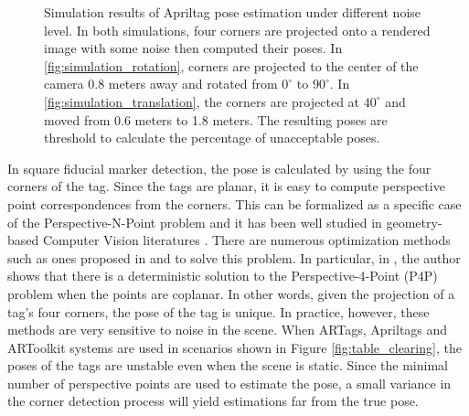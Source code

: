 \begin{figure}[h]
\caption{Simulation results of Apriltag pose estimation under different noise level. In both simulations, four corners are projected onto a rendered image with some noise then computed their poses. In \ref{fig:simulation_rotation}, corners are projected to the center of the camera 0.8 meters away and rotated from $0^{\circ}$ to $90^{\circ}$. In \ref{fig:simulation_translation}, the corners are projected at $40^{\circ}$ and moved from 0.6 meters to 1.8 meters. The resulting poses are threshold to calculate the percentage of unacceptable poses.}
\label{fig:simulation_results}
\end{figure}

In square fiducial marker detection, the pose is calculated by using the four corners of the tag. Since the tags are planar, it is easy to compute perspective point correspondences from the corners. This can be formalized as a specific case of the Perspective-N-Point problem and it has been well studied in geometry-based Computer Vision literatures \citep{hartley2003multiple, zhang2005general}. There are numerous optimization methods such as ones proposed in \citep{dementhon1992exact} and \citep{haralick1994review} to solve this problem. In particular, in \citep{horaud1989analytic}, the author shows that there is a deterministic solution to the Perspective-4-Point (P4P) problem when the points are coplanar. In other words, given the projection of a tag's four corners, the pose of the tag is unique. In practice, however, these methods are very sensitive to noise in the scene. When ARTags, Apriltags and ARToolkit systems are used in scenarios shown in Figure \ref{fig:table_clearing}, the poses of the tags are unstable even when the scene is static. Since the minimal number of perspective points are used to estimate the pose, a small variance in the corner detection process will yield estimations far from the true pose. 

